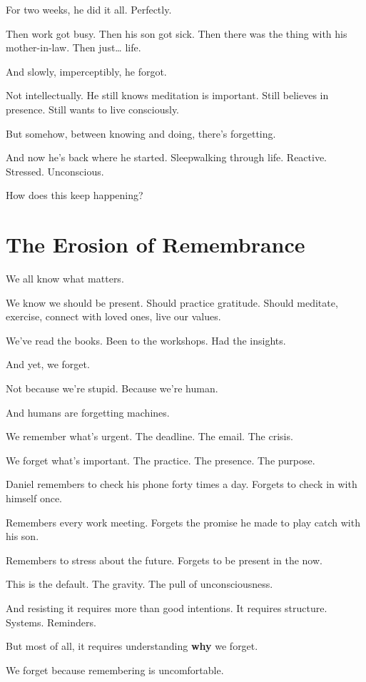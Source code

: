 \documentclass[11pt,twoside]{book}
\begin{document}
For two weeks, he did it all. Perfectly.

Then work got busy. Then his son got sick. Then there was the thing with his mother-in-law. Then just\ldots{} life.

And slowly, imperceptibly, he forgot.

Not intellectually. He still knows meditation is important. Still believes in presence. Still wants to live consciously.

But somehow, between knowing and doing, there's forgetting.

And now he's back where he started. Sleepwalking through life. Reactive. Stressed. Unconscious.

How does this keep happening?

\section*{The Erosion of Remembrance}

We all know what matters.

We know we should be present. Should practice gratitude. Should meditate, exercise, connect with loved ones, live our values.

We've read the books. Been to the workshops. Had the insights.

And yet, we forget.

Not because we're stupid. Because we're human.

And humans are forgetting machines.

We remember what's urgent. The deadline. The email. The crisis.

We forget what's important. The practice. The presence. The purpose.

Daniel remembers to check his phone forty times a day. Forgets to check in with himself once.

Remembers every work meeting. Forgets the promise he made to play catch with his son.

Remembers to stress about the future. Forgets to be present in the now.

This is the default. The gravity. The pull of unconsciousness.

And resisting it requires more than good intentions. It requires structure. Systems. Reminders.

But most of all, it requires understanding \textbf{why} we forget.

We forget because remembering is uncomfortable.
\end{document}
